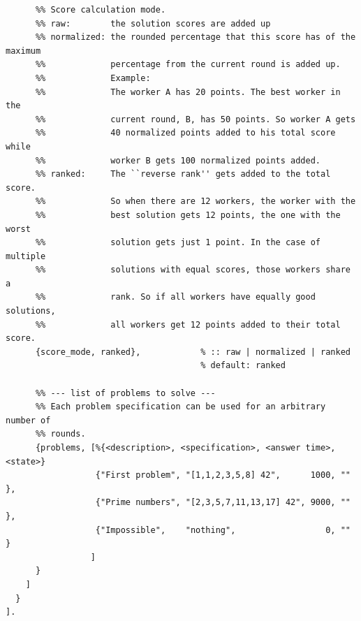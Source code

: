 \documentclass[a4paper, 12pt]{article}
\begin{document}
\begin{lstlisting}
      %% Score calculation mode.
      %% raw:        the solution scores are added up
      %% normalized: the rounded percentage that this score has of the maximum
      %%             percentage from the current round is added up.
      %%             Example:
      %%             The worker A has 20 points. The best worker in the
      %%             current round, B, has 50 points. So worker A gets
      %%             40 normalized points added to his total score while
      %%             worker B gets 100 normalized points added.
      %% ranked:     The ``reverse rank'' gets added to the total score.
      %%             So when there are 12 workers, the worker with the
      %%             best solution gets 12 points, the one with the worst
      %%             solution gets just 1 point. In the case of multiple
      %%             solutions with equal scores, those workers share a
      %%             rank. So if all workers have equally good solutions,
      %%             all workers get 12 points added to their total score.
      {score_mode, ranked},            % :: raw | normalized | ranked
                                       % default: ranked

      %% --- list of problems to solve ---
      %% Each problem specification can be used for an arbitrary number of
      %% rounds.
      {problems, [%{<description>, <specification>, <answer time>, <state>}
                  {"First problem", "[1,1,2,3,5,8] 42",      1000, ""     },
                  {"Prime numbers", "[2,3,5,7,11,13,17] 42", 9000, ""     },
                  {"Impossible",    "nothing",                  0, ""     }
                 ]
      }
    ]
  }
].
\end{lstlisting}
\end{document}
